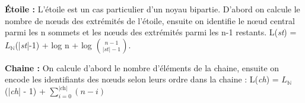 \textbf{Étoile :} L'étoile est un cas particulier d'un noyau bipartie. D'abord on calcule le nombre de nœuds des extrémités de l'étoile, ensuite on identifie le nœud central parmi les n sommets et les nœuds des extrémités parmi les n-1 restants.
L(\textit{st}) = $L_{\mathbb{N}}$(|\textit{st}|-1) +  log n + log ${n-1}\choose{|st|-1}$.

\textbf{Chaine :} On calcule d'abord le nombre d'éléments de la chaine, ensuite on encode les identifiants des nœuds selon leurs ordre dans la chaine :
L(\textit{ch}) = $L_{\mathbb{N}}$(|\textit{ch}| - 1) + $\sum\limits_{i=0}^{|\textit{ch}|} ( n - i )$

